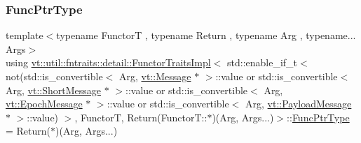 \subsubsection{\texorpdfstring{Func\+Ptr\+Type}{FuncPtrType}}
{\footnotesize\ttfamily template$<$typename FunctorT , typename Return , typename Arg , typename... Args$>$ \\
using \hyperlink{structvt_1_1util_1_1fntraits_1_1detail_1_1_functor_traits_impl}{vt\+::util\+::fntraits\+::detail\+::\+Functor\+Traits\+Impl}$<$ std\+::enable\+\_\+if\+\_\+t$<$ not(std\+::is\+\_\+convertible$<$ Arg, \hyperlink{namespacevt_a3a3ddfef40b4c90915fa43cdd5f129ea}{vt\+::\+Message} $\ast$ $>$\+::value or std\+::is\+\_\+convertible$<$ Arg, \hyperlink{namespacevt_a1125ac1da6c0bbf141e0ea0739d7602d}{vt\+::\+Short\+Message} $\ast$ $>$\+::value or std\+::is\+\_\+convertible$<$ Arg, \hyperlink{namespacevt_ad67368ffae52d7325002586b41bb150e}{vt\+::\+Epoch\+Message} $\ast$ $>$\+::value or std\+::is\+\_\+convertible$<$ Arg, \hyperlink{namespacevt_a89a92229c5622b855c02c549f83a1a68}{vt\+::\+Payload\+Message} $\ast$ $>$\+::value) $>$, FunctorT, Return(Functor\+T\+::$\ast$)(Arg, Args...)$>$\+::\hyperlink{structvt_1_1util_1_1fntraits_1_1detail_1_1_functor_traits_impl_3_01std_1_1enable__if__t_3_01not_ff7bf429a58012799da4cee5038d568d_a2cabfb292c5b20741e8e2c94215e18c7}{Func\+Ptr\+Type} =  Return($\ast$)(Arg, Args...)}

